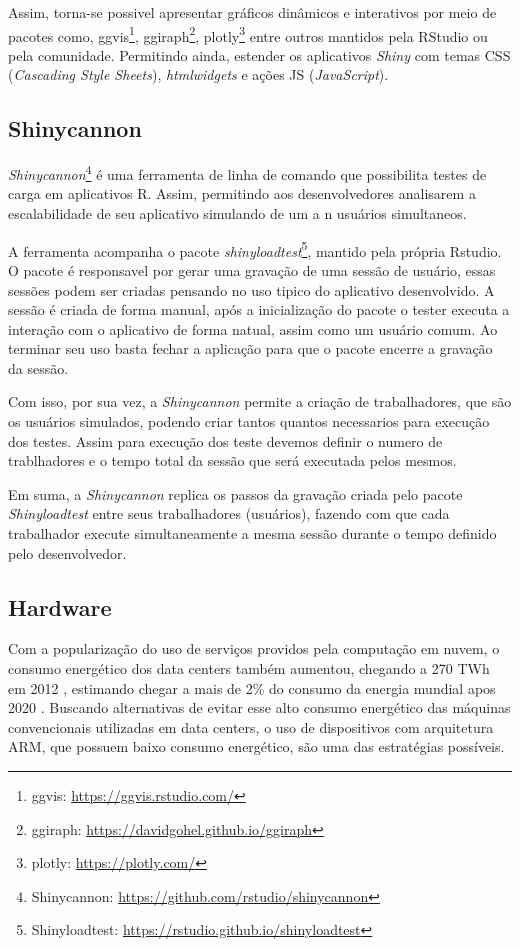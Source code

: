 \documentclass[12pt,english,brazil]{article}
\begin{document}
Assim, torna-se possivel apresentar gráficos dinâmicos e interativos por meio de pacotes como, ggvis\footnote{ggvis: \url{https://ggvis.rstudio.com/}}, ggiraph\footnote{ggiraph: \url{https://davidgohel.github.io/ggiraph}}, plotly\footnote{plotly: \url{https://plotly.com/}} entre outros mantidos pela RStudio ou pela comunidade. Permitindo ainda, estender os aplicativos \emph{Shiny} com temas CSS (\emph{Cascading Style Sheets}), \emph{htmlwidgets} e ações JS (\emph{JavaScript}).

\subsection{Shinycannon} \label{sec:Shinycannon}

\textit{Shinycannon}\footnote{Shinycannon: \url{https://github.com/rstudio/shinycannon}} é uma ferramenta de linha de comando que possibilita testes de carga em aplicativos R. Assim, permitindo aos desenvolvedores analisarem a escalabilidade de seu aplicativo simulando de um a n usuários simultaneos.

A ferramenta acompanha o pacote \textit{shinyloadtest}\footnote{Shinyloadtest: \url{https://rstudio.github.io/shinyloadtest}}, mantido pela própria Rstudio. O pacote é responsavel por gerar uma gravação de uma sessão de usuário, essas sessões podem ser criadas pensando no uso tipico do aplicativo desenvolvido\cite{shinyloadtest}. A sessão é criada de forma manual, após a inicialização do pacote o tester executa a interação com o aplicativo de forma natual, assim como um usuário comum. Ao terminar seu uso basta fechar a aplicação para que o pacote encerre a gravação da sessão.

Com isso, por sua vez, a \textit{Shinycannon} permite a criação de trabalhadores, que são os usuários simulados, podendo criar tantos quantos necessarios para execução dos testes. Assim para execução dos teste devemos definir o numero de trablhadores e o tempo total da sessão que será executada pelos mesmos. 

Em suma, a \textit{Shinycannon} replica os passos da gravação criada pelo pacote \textit{Shinyloadtest} entre seus trabalhadores (usuários), fazendo com que cada trabalhador execute simultaneamente a mesma sessão durante o tempo definido pelo desenvolvedor.

\subsection{Hardware}\label{sec:Hardware}
Com a popularização do uso de serviços providos pela computação em nuvem, o consumo energético dos data centers também aumentou, chegando a 270 TWh em 2012 \cite{VanHeddeghem:2014:TWI:2657027.2657141}, estimando chegar a mais de 2\% do consumo da energia mundial apos 2020 \cite{energy}.  Buscando alternativas de evitar esse alto consumo energético das máquinas convencionais utilizadas em data centers, o uso de dispositivos com arquitetura ARM, que possuem baixo consumo energético, são uma das estratégias possíveis.
\end{document}
